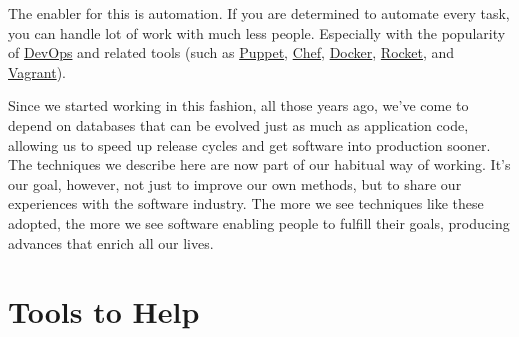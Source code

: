 \documentclass[12pt]{article}
\begin{document}
The enabler for this is automation. If you are determined to automate
every task, you can handle lot of work with much less people. Especially
with the popularity of
\href{https://martinfowler.com/bliki/DevOpsCulture.html}{DevOps} and
related tools (such as \href{https://puppetlabs.com}{Puppet},
\href{https://www.chef.io/chef}{Chef},
\href{https://www.docker.com}{Docker},
\href{https://github.com/coreos/rkt}{Rocket}, and
\href{https://www.vagrantup.com}{Vagrant}).

Since we started working in this fashion, all those years ago, we've
come to depend on databases that can be evolved just as much as
application code, allowing us to speed up release cycles and get
software into production sooner. The techniques we describe here are now
part of our habitual way of working. It's our goal, however, not just to
improve our own methods, but to share our experiences with the software
industry. The more we see techniques like these adopted, the more we see
software enabling people to fulfill their goals, producing advances that
enrich all our lives.

\section{Tools to Help}
\end{document}
